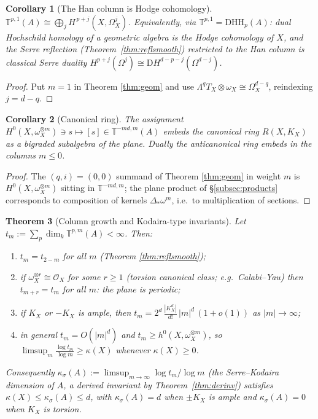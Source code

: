 \documentclass[11pt]{amsart}
\newtheorem{theorem}{Theorem}[section]
\newtheorem{corollary}[theorem]{Corollary}
\theoremstyle{definition}
\newcommand{\T}{\mathbb{T}}
\newcommand{\HH}{\mathrm{HH}}
\newcommand{\D}{\mathrm{D}}
\newcommand{\kk}{k}
\begin{document}
\begin{corollary}[The Han column is Hodge cohomology]\label{cor:hodge}
$\T^{p,1}(A)\cong\bigoplus_{j}H^{\,p+j}(X,\Omega^j_X)$. Equivalently, via
$\T^{p,1}=\D\HH_p(A)$: dual Hochschild homology of a geometric algebra is the
Hodge cohomology of $X$, and the Serre reflection
(Theorem~\ref{thm:reflsmooth}) restricted to the Han column is classical
Serre duality $H^{p+j}(\Omega^j)\cong\D H^{d-p-j}(\Omega^{d-j})$.
\end{corollary}

\begin{proof}
Put $m=1$ in Theorem \ref{thm:geom} and use
$\Lambda^qT_X\otimes\omega_X\cong\Omega^{d-q}_X$, reindexing $j=d-q$.
\end{proof}

\begin{corollary}[Canonical ring]\label{cor:canring}
The assignment $H^0(X,\omega_X^{\otimes m})\ni s\mapsto
[s]\in\T^{-md,m}(A)$ embeds the canonical ring $R(X,K_X)$ as a bigraded
subalgebra of the plane. Dually the anticanonical ring embeds in the columns
$m\le0$.
\end{corollary}

\begin{proof}
The $(q,i)=(0,0)$ summand of Theorem \ref{thm:geom} in weight $m$ is
$H^0(X,\omega_X^{\otimes m})$ sitting in $\T^{-md,m}$; the plane product of
\S\ref{subsec:products} corresponds to composition of kernels
$\Delta_*\omega^m$, i.e.\ to multiplication of sections.
\end{proof}

\begin{theorem}[Column growth and Kodaira-type invariants]\label{thm:growth}
Let $t_m:=\sum_p\dim_\kk\T^{p,m}(A)<\infty$. Then:
\begin{enumerate}
\item $t_m=t_{2-m}$ for all $m$ (Theorem \ref{thm:reflsmooth});
\item if $\omega_X^{\otimes r}\cong\mathcal O_X$ for some $r\ge1$
(torsion canonical class; e.g.\ Calabi--Yau) then $t_{m+r}=t_m$ for all $m$:
the plane is periodic;
\item if $K_X$ or $-K_X$ is ample, then
$t_m=2^d\,\frac{|K_X^d|}{d!}\,|m|^d\,(1+o(1))$ as $|m|\to\infty$;
\item in general $t_m=O(|m|^d)$ and
$t_m\ge h^0(X,\omega_X^{\otimes m})$, so
$\limsup_m\frac{\log t_m}{\log m}\ge\kappa(X)$ whenever $\kappa(X)\ge0$.
\end{enumerate}
Consequently
$\kappa_\sigma(A):=\limsup_{m\to\infty}\log t_m/\log m$
(the \emph{Serre--Kodaira dimension} of $A$, a derived invariant by
Theorem~\ref{thm:derinv}) satisfies
$\kappa(X)\le\kappa_\sigma(A)\le d$, with $\kappa_\sigma(A)=d$ when $\pm K_X$
is ample and $\kappa_\sigma(A)=0$ when $K_X$ is torsion.
\end{theorem}
\end{document}
